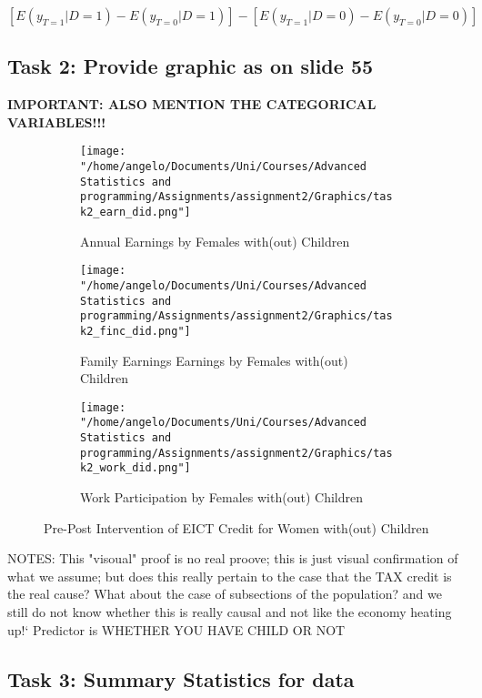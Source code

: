 \documentclass[a4paper]{article}
\begin{document}
$
[E(y_{T=1} | D=1) - E(y_{T=0} | D=1)] - [E(y_{T=1} | D=0) - E(y_{T=0} | D=0)]
$




\subsection{Task 2: Provide graphic as on slide 55}

\textbf{IMPORTANT: ALSO MENTION THE CATEGORICAL VARIABLES!!!}



\begin{wrapfigure}{L}{9cm}
\centering
\begin{subfigure}[b]{0.5\textwidth}
    \texttt{[image: "/home/angelo/Documents/Uni/Courses/Advanced Statistics and programming/Assignments/assignment2/Graphics/task2\_earn\_did.png"]} 
   \caption{Annual Earnings by Females with(out) Children}
   \label{fig:Ng2}
\end{subfigure}

\begin{subfigure}[b]{0.5\textwidth}
    \texttt{[image: "/home/angelo/Documents/Uni/Courses/Advanced Statistics and programming/Assignments/assignment2/Graphics/task2\_finc\_did.png"]} 
   \caption{Family Earnings Earnings by Females with(out) Children}
   \label{fig:Ng2}
\end{subfigure}

\begin{subfigure}[b]{0.5\textwidth}
    \texttt{[image: "/home/angelo/Documents/Uni/Courses/Advanced Statistics and programming/Assignments/assignment2/Graphics/task2\_work\_did.png"]}  
   \caption{Work Participation by Females with(out) Children}
   \label{fig:Ng2}
\end{subfigure}
\captionsetup{justification=centering}
\caption{Pre-Post Intervention of EICT Credit for Women with(out) Children}
\end{wrapfigure}





NOTES: This "visoual" proof is no real proove; this is just visual confirmation of what we assume; but does this really pertain to the case that the TAX credit is the real cause? What about the case of subsections of the population? and we still do not know whether this is really causal and not like the economy heating up!`
Predictor is WHETHER YOU HAVE CHILD OR NOT


\subsection{Task 3: Summary Statistics for data}
\end{document}

